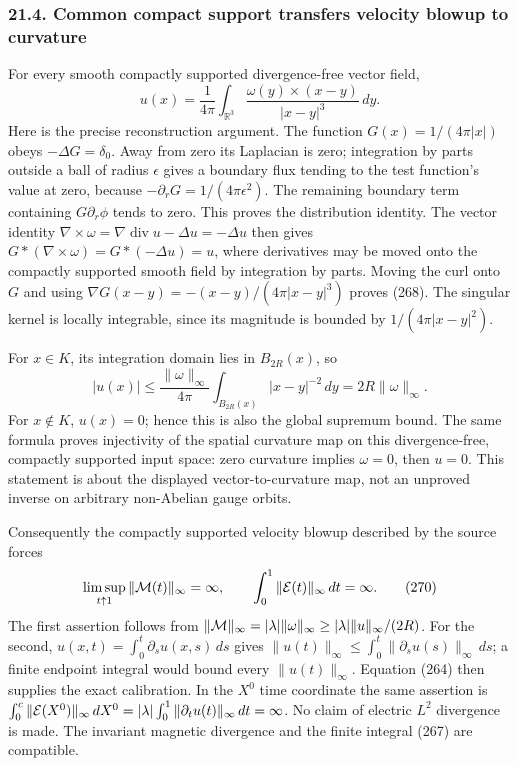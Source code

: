\documentclass[
  11pt,
]{article}
\begin{document}
\subsubsection{21.4. Common compact support transfers velocity blowup to
curvature}\label{common-compact-support-transfers-velocity-blowup-to-curvature}

For every smooth compactly supported divergence-free vector field, \[
 u(x)=\frac1{4\pi}\int_{\mathbb R^3}
       \frac{\omega(y)\times(x-y)}{|x-y|^3}\,dy .
 \tag{268}
\] Here is the precise reconstruction argument. The function
\(G(x)=1/(4\pi|x|)\) obeys \(-\Delta G=\delta_0\). Away from zero its
Laplacian is zero; integration by parts outside a ball of radius
\(\epsilon\) gives a boundary flux tending to the test function's value
at zero, because \(-\partial_rG=1/(4\pi\epsilon^2)\). The remaining
boundary term containing \(G\partial_r\phi\) tends to zero. This proves
the distribution identity. The vector identity
\(\nabla\times\omega=\nabla\operatorname{div}u-\Delta u=-\Delta u\) then
gives \(G*(\nabla\times\omega)=G*(-\Delta u)=u\), where derivatives may
be moved onto the compactly supported smooth field by integration by
parts. Moving the curl onto \(G\) and using
\(\nabla G(x-y)=-(x-y)/(4\pi|x-y|^3)\) proves (268). The singular kernel
is locally integrable, since its magnitude is bounded by
\(1/(4\pi|x-y|^2)\).

For \(x\in K\), its integration domain lies in \(B_{2R}(x)\), so \[
 |u(x)|\le\frac{\|\omega\|_\infty}{4\pi}
       \int_{B_{2R}(x)}|x-y|^{-2}\,dy
       =2R\|\omega\|_\infty.
 \tag{269}
\] For \(x\notin K\), \(u(x)=0\); hence this is also the global supremum
bound. The same formula proves injectivity of the spatial curvature map
on this divergence-free, compactly supported input space: zero curvature
implies \(\omega=0\), then \(u=0\). This statement is about the
displayed vector-to-curvature map, not an unproved inverse on arbitrary
non-Abelian gauge orbits.

Consequently the compactly supported velocity blowup described by the
source forces \[
 \limsup_{t\uparrow1}\|{\cal M}(t)\|_\infty=\infty,
 \qquad
 \int_0^1\|{\cal E}(t)\|_\infty\,dt=\infty .
 \tag{270}
\] The first assertion follows from
\(\|{\cal M}\|_\infty=|\lambda|\|\omega\|_\infty
\ge|\lambda|\|u\|_\infty/(2R)\). For the second,
\(u(x,t)=\int_0^t\partial_su(x,s)\,ds\) gives
\(\|u(t)\|_\infty\le\int_0^t\|\partial_su(s)\|_\infty\,ds\); a finite
endpoint integral would bound every \(\|u(t)\|_\infty\). Equation (264)
then supplies the exact calibration. In the \(X^0\) time coordinate the
same assertion is \(\int_0^c\|{\cal E}(X^0)\|_\infty\,dX^0
=|\lambda|\int_0^1\|\partial_tu(t)\|_\infty\,dt=\infty\). No claim of
electric \(L^2\) divergence is made. The invariant magnetic divergence
and the finite integral (267) are compatible.
\end{document}

